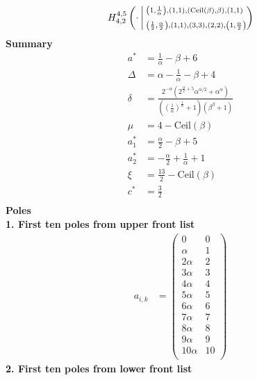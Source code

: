 \documentclass{article}
\newcommand{\FoxH}[5]{H_{#2}^{#1}\left(#3\:\middle\vert\: \begin{subarray}{l}#4\\[0.4em] #5\end{subarray}\right)}
\begin{document}
\begin{align*}
\FoxH{4,5}{4,2}{\cdot}{\left(1, \frac{1}{\alpha }\right), \left(1, 1\right), \left(\text{Ceil}(\beta ), \beta\right), \left(1, 1\right)}{\left(\frac{1}{2}, \frac{\alpha }{2}\right), \left(1, 1\right), \left(3, 3\right), \left(2, 2\right), \left(1, \frac{\alpha }{2}\right)}
\end{align*}
\noindent\textbf{Summary}
\begin{align*}
a^* &= \frac{1}{\alpha }-\beta +6 \\
\Delta &= \alpha -\frac{1}{\alpha }-\beta +4 \\
\delta &= \frac{2^{-\alpha } \left(2^{\frac{\alpha }{2}+5} \alpha ^{\alpha /2}+\alpha ^{\alpha }\right)}{\left(\left(\frac{1}{\alpha }\right)^{\frac{1}{\alpha }}+1\right) \left(\beta ^{\beta }+1\right)} \\
\mu &= 4-\text{Ceil}(\beta ) \\
a_1^* &= \frac{\alpha }{2}-\beta +5 \\
a_2^* &= -\frac{\alpha }{2}+\frac{1}{\alpha }+1 \\
\xi &= \frac{13}{2}-\text{Ceil}(\beta ) \\
c^* &= \frac{3}{2} \\
\end{align*}
\noindent\textbf{Poles}\\
\noindent\textbf{1. First ten poles from upper front list}
\begin{align*}
a_{i,k} &= \left(
\begin{array}{cc}
 0 & 0 \\
 \alpha  & 1 \\
 2 \alpha  & 2 \\
 3 \alpha  & 3 \\
 4 \alpha  & 4 \\
 5 \alpha  & 5 \\
 6 \alpha  & 6 \\
 7 \alpha  & 7 \\
 8 \alpha  & 8 \\
 9 \alpha  & 9 \\
 10 \alpha  & 10 \\
\end{array}
\right)
\end{align*}
\noindent\textbf{2. First ten poles from lower front list}
\end{document}
